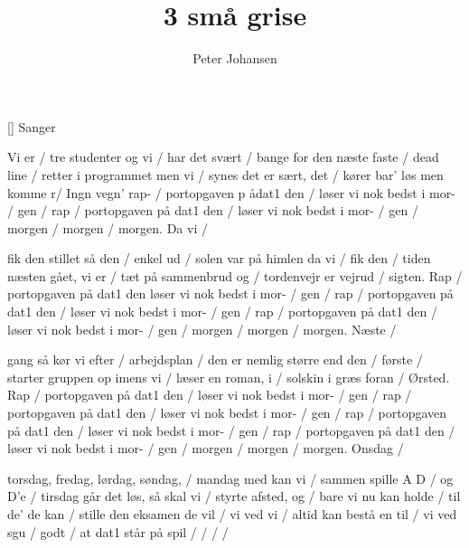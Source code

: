 \documentclass[a4paper,11pt]{article}
\title{3 små grise}
\author{Peter Johansen}
\begin{document}
\maketitle

\begin{roles}
[] Sanger
\end{roles}

\begin{song}
Vi er / tre studenter og vi / har det svært /
bange for den næste faste / dead line /
retter i programmet men vi / synes det er sært, det /
kører bar' løs men komme r/ Ingn vegn' rap- /
portopgaven p ådat1 den / løser vi nok bedst i mor- /
gen / rap /
portopgaven på dat1 den / løser vi nok bedst i mor- /
gen / morgen / morgen / morgen.  Da vi /

fik den stillet så den / enkel ud /
solen var på himlen da vi / fik den /
tiden næsten gået, vi er / tæt på sammenbrud og /
tordenvejr er vejrud / sigten. Rap /
portopgaven på dat1 den løser vi nok bedst i mor- /
gen / rap /
portopgaven på dat1 den / løser vi nok bedst i mor- /
gen / rap /
portopgaven på dat1 den / løser vi nok bedst i mor- /
gen / morgen / morgen / morgen.  Næste /

gang så kør vi efter / arbejdsplan /
den er nemlig større end den / første /
starter gruppen op imens vi / læser en roman, i /
solskin i græs foran / Ørsted. Rap /
portopgaven på dat1 den / løser vi nok bedst i mor- /
gen / rap /
portopgaven på dat1 den / løser vi nok bedst i mor- /
gen / rap /
portopgaven på dat1 den / løser vi nok bedst i mor- /
gen / rap /
portopgaven på dat1 den / løser vi nok bedst i mor- /
gen / morgen / morgen / morgen.  Onsdag /

torsdag, fredag, lørdag, søndag, / mandag med kan vi /
sammen spille A D / og D'e /
tirsdag går det løs, så skal vi / styrte afsted, og /
bare vi nu kan holde / til de' de kan /
stille den eksamen de vil / vi ved vi /
altid kan bestå en til / vi ved sgu /
godt / at dat1 står på spil / / / /
\end{song}
\end{document}
